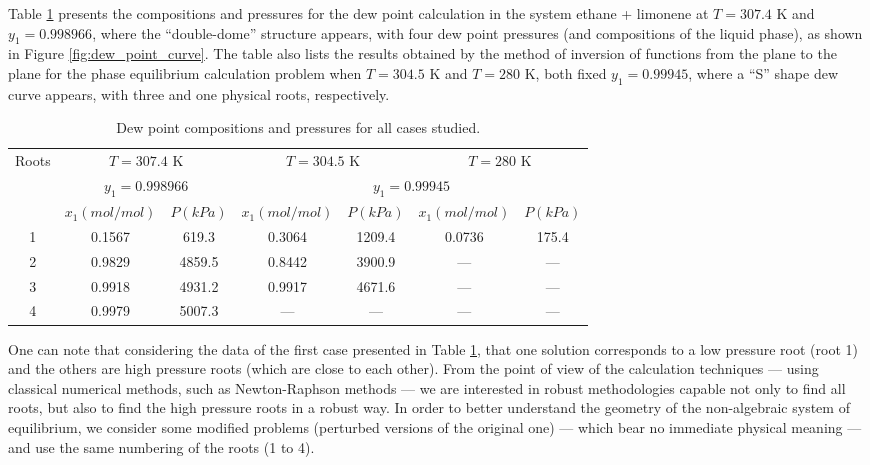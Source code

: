 \documentclass[journal=iecred,manuscript=article]{achemso}
\theoremstyle{definition}
\theoremstyle{remark}
\begin{document}
Table \ref{tab:resultados_pontos_orvalho_pressoes} presents the compositions and pressures for the dew point calculation in the system ethane + limonene at $T = 307.4$ K and $y_{1} = 0.998966 $, where the \enquote{double-dome} structure appears, with four dew point pressures (and compositions of the liquid phase), as shown in Figure \ref{fig:dew_point_curve}. The table also lists the results obtained by the method of inversion of functions from the plane to the plane for the phase equilibrium calculation problem when $ T = 304.5 $ K and $ T = 280 $ K, both fixed $ y_{1} = 0.99945 $, where a \enquote{S} shape dew curve appears, with three and one physical roots, respectively.

\begin{table}
\centering
\renewcommand*{\arraystretch}{1.3}
\caption{Dew point compositions and pressures for all cases studied.}
\label{tab:resultados_pontos_orvalho_pressoes}
\begin{tabular}{ccccccc}
\hline
\multirow{3}{*}{Roots} & \multicolumn{2}{c}{$ T = 307.4 $ K} & \multicolumn{2}{c}{$ T = 304.5 $ K} & \multicolumn{2}{c}{$ T = 280 $ K} \\
 & \multicolumn{2}{c}{$ y_{1} = 0.998966 $} & \multicolumn{4}{c}{$ y_{1} = 0.99945 $} \\ \cline{2-7} 
 & $ x_{1} \left( mol / mol \right) $ & $ P \left( kPa \right) $ & $ x_{1} \left( mol / mol \right) $ & $ P \left( kPa \right) $ & $ x_{1} \left( mol / mol \right) $ & $ P \left( kPa \right) $ \\ \hline
1 & 0.1567 & 619.3 & 0.3064 & 1209.4 & 0.0736 & 175.4 \\
2 & 0.9829 & 4859.5 & 0.8442 & 3900.9 & --- & --- \\
3 & 0.9918 & 4931.2 & 0.9917 & 4671.6 & --- & --- \\
4 & 0.9979 & 5007.3 & --- & --- & --- & --- \\ \hline
\end{tabular}
\end{table}

One can note that considering the data of the first case presented in Table \ref{tab:resultados_pontos_orvalho_pressoes}, that one solution corresponds to a low pressure root (root 1) and the others are high pressure roots (which are close to each other). From the point of view of the calculation techniques --- using classical numerical methods, such as Newton-Raphson methods --- we are interested in robust methodologies capable not only to find all roots, but also to find  the high pressure roots in a robust way. In order to better understand the geometry of the non-algebraic system of equilibrium, we consider some modified problems (perturbed versions of the original one) --- which bear no immediate physical meaning --- and use the same numbering of the roots (1 to 4).
 
\end{document}
